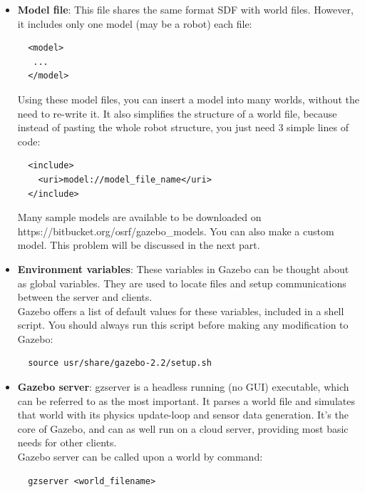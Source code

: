 \documentclass[pdftex,12pt,a4paper]{article}
\begin{document}
\begin{itemize}
  \newpage
  \item \textbf{Model file}: This file shares the same format SDF with world files. However, it includes only one model (may be a robot) each file:
  \begin{lstlisting}
  <model>
   ...
  </model>
  \end{lstlisting}
  Using these model files, you can insert a model into many worlds, without the need to re-write it. It also simplifies the structure of a world file, because instead of pasting the whole robot structure, you just need 3 simple lines of code:
  \begin{lstlisting}
  <include>
    <uri>model://model_file_name</uri>
  </include>
  \end{lstlisting}
  Many sample models are available to be downloaded on\\ https://bitbucket.org/osrf/gazebo\_models. You can also make a custom model. This problem will be discussed in the next part.
  \item \textbf{Environment variables}: These variables in Gazebo can be thought about as global variables. They are used to locate files and setup communications between the server and clients.\\
  Gazebo offers a list of default values for these variables, included in a shell script. You should always run this script before making any modification to Gazebo:
  \begin{lstlisting}
  source usr/share/gazebo-2.2/setup.sh
  \end{lstlisting}
  \item \textbf{Gazebo server}: gzserver is a headless running (no GUI) executable, which can be referred to as the most important. It parses a world file and simulates that world with its physics update-loop and sensor data generation. It's the core of Gazebo, and can as well run on a cloud server, providing most basic needs for other clients.\\
  Gazebo server can be called upon a world by command:
  \begin{lstlisting}
  gzserver <world_filename>
  \end{lstlisting}
  

\end{itemize}
\end{document}

